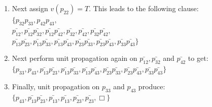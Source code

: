 \documentclass[]{exam}
\begin{document}
\begin{questions}
\begin{parts}
\begin{solution}
\begin{enumerate}
\item Next assign $v(p_{22}) = T$. This leads to the following clause:\\
$\{ 
         p_{32}p_{33}, 
         p_{42}p_{43},$ \\
$\bar{p_{12}},
 \bar{p_{12}}\bar{p_{32}},
 \bar{p_{12}}\bar{p_{42}},
             \bar{p_{32}},
             \bar{p_{42}},
 \bar{p_{32}}\bar{p_{42}},$\\
$\bar{p_{13}}\bar{p_{23}},
 \bar{p_{13}}\bar{p_{33}},
 \bar{p_{13}}\bar{p_{43}},
 \bar{p_{23}}\bar{p_{33}},
 \bar{p_{23}}\bar{p_{43}},
 \bar{p_{33}}\bar{p_{43}}\}$ \\
\item Next perform unit propagation again on $\bar{p_{12}}, \bar{p_{32}}$ and
$\bar{p_{42}}$ to get:\\
$\{ 
               p_{33}, 
               p_{43},
 \bar{p_{13}}\bar{p_{23}},
 \bar{p_{13}}\bar{p_{33}},
 \bar{p_{13}}\bar{p_{43}},
 \bar{p_{23}}\bar{p_{33}},
 \bar{p_{23}}\bar{p_{43}},
 \bar{p_{33}}\bar{p_{43}}\}$ \\
\item Finally, unit propagation on $p_{33}$ and $p_{43}$ produce:\\
$\{ 
               p_{43},
 \bar{p_{13}}\bar{p_{23}},
 \bar{p_{13}}            ,
 \bar{p_{13}}            ,
 \bar{p_{23}}            ,
 \bar{p_{23}}            ,
             \Box       \}$ \\
\end{enumerate}
\end{solution}
\end{parts}

\end{questions}
\end{document}
